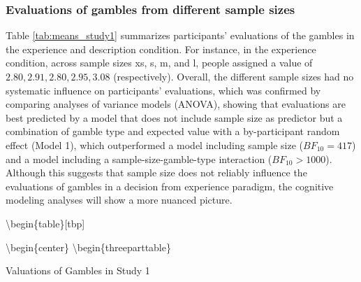 \documentclass[a4paper, man, floatsintext]{apa6}
\title{}
\author{Jana B. Jarecki}
\date{07 November, 2019}
\begin{document}
\subsubsection{Evaluations of gambles from different sample sizes}

Table \ref{tab:means_study1} summarizes participants' evaluations of the
gambles in the experience and description condition. For instance, in
the experience condition, across sample sizes xs, s, m, and l, people
assigned a value of \(2.80, 2.91, 2.80, 2.95, 3.08\) (respectively).
Overall, the different sample sizes had no systematic influence on
participants' evaluations, which was confirmed by comparing analyses of
variance models (ANOVA), showing that evaluations are best predicted by
a model that does not include sample size as predictor but a combination
of gamble type and expected value with a by-participant random effect
(Model 1), which outperformed a model including sample size
(\(BF_{10}= 417\)) and a model including a sample-size-gamble-type
interaction (\(BF_{10} > 1000\)). Although this suggests that sample
size does not reliably influence the evaluations of gambles in a
decision from experience paradigm, the cognitive modeling analyses will
show a more nuanced picture.

\textbackslash{}begin\{table\}{[}tbp{]}

\textbackslash{}begin\{center\} \textbackslash{}begin\{threeparttable\}

\caption{\label{tab:means_study1}Valuations of Gambles in Study 1}
\end{document}
